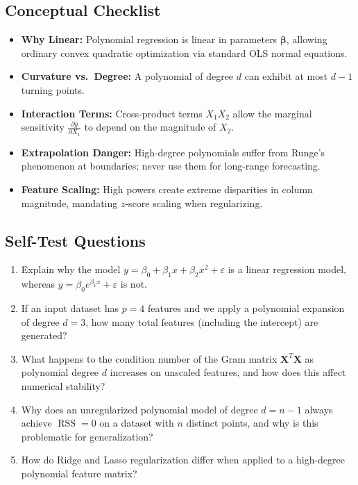 \documentclass[11pt,a4paper]{article}
\numberwithin{equation}{section}
\newcommand{\RSS}{\operatorname{RSS}}
\newcommand{\X}{\mathbf{X}}
\newcommand{\bta}{\boldsymbol{\beta}}
\begin{document}
\subsection{Conceptual Checklist}
\begin{itemize}
  \item \textbf{Why Linear:} Polynomial regression is linear in parameters $\bta$, allowing ordinary convex quadratic optimization via standard OLS normal equations.
  \item \textbf{Curvature vs.\ Degree:} A polynomial of degree $d$ can exhibit at most $d-1$ turning points.
  \item \textbf{Interaction Terms:} Cross-product terms $X_1 X_2$ allow the marginal sensitivity $\frac{\partial \hat{y}}{\partial X_1}$ to depend on the magnitude of $X_2$.
  \item \textbf{Extrapolation Danger:} High-degree polynomials suffer from Runge's phenomenon at boundaries; never use them for long-range forecasting.
  \item \textbf{Feature Scaling:} High powers create extreme disparities in column magnitude, mandating $z$-score scaling when regularizing.
\end{itemize}

\subsection{Self-Test Questions}
\begin{enumerate}
  \item Explain why the model $y = \beta_0 + \beta_1 x + \beta_2 x^2 + \varepsilon$ is a linear regression model, whereas $y = \beta_0 e^{\beta_1 x} + \varepsilon$ is not.
  \item If an input dataset has $p=4$ features and we apply a polynomial expansion of degree $d=3$, how many total features (including the intercept) are generated?
  \item What happens to the condition number of the Gram matrix $\X^T\X$ as polynomial degree $d$ increases on unscaled features, and how does this affect numerical stability?
  \item Why does an unregularized polynomial model of degree $d=n-1$ always achieve $\RSS = 0$ on a dataset with $n$ distinct points, and why is this problematic for generalization?
  \item How do Ridge and Lasso regularization differ when applied to a high-degree polynomial feature matrix?
\end{enumerate}
\end{document}
